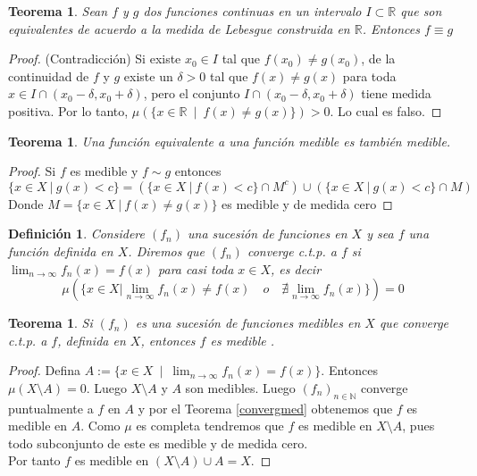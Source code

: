 \documentclass[twoside,12pt,a4 paper,openright]{book}
\newtheorem{teo}[claim]{Teorema}
\newtheorem{defi}[claim]{Definici\'on}
\begin{document}
\begin{teo}
    Sean $f$ y $g$ dos funciones continuas en un intervalo $I\subset\mathbb{R}$  que son equivalentes de acuerdo a la medida de Lebesgue construida en $\mathbb{R}$. Entonces $f\equiv g$ 
\end{teo}
\begin{proof}
    (Contradicci\'on) Si existe $x_0\in I$ tal que $f(x_0)\neq g(x_0)$, de la continuidad de $f$ y $g$ existe un $\delta >0$ tal que $f(x)\neq g(x)$ para toda $x \in I\cap(x_0-\delta, x_0+\delta)$, pero el conjunto $I\cap(x_0-\delta, x_0+\delta)$ tiene medida positiva.  Por lo tanto, $\mu(\{x\in\mathbb R \ \mid \ f(x)\neq g(x)\}) >0$. Lo cual es falso. 
\end{proof}




\begin{teo}
    Una funci\'on equivalente a una funci\'on medible es tambi\'en medible. 
    \end{teo}
    \begin{proof}
    Si $f$ es medible y $f\sim g$ entonces
    $$\{x \in  X \ | \ g(x)<c\} = (\{x \in  X \ | \  f(x)< c\}\cap M^c)\cup (\{x \in  X \ | \  g(x)<c \}\cap M)$$
    Donde $M = \{x \in  X \ | \  f(x)\neq g(x)\}$ es medible y de medida cero
\end{proof}
\begin{defi}
    Considere $(f_n)$ una sucesi\'on de funciones en $X$ y sea $f$ una funci\'on definida en $X$. Diremos que $(f_n)$ converge c.t.p. a $f$ si 
 $\lim_{n\to\infty}f_n(x) = f(x)$ 
    para casi toda $x\in X$, es decir 
    $$\mu\left(\{x\in X | \lim_{n\to \infty}f_n(x)\neq f(x) \quad o\quad \nexists\lim_{n\to \infty}f_n(x)\}\right) = 0$$
\end{defi}






\begin{teo}
    Si $(f_n)$ es una sucesi\'on de funciones medibles en $X$ que  converge c.t.p. a $f$, definida en $X$, entonces $f$ es medible .
\end{teo}

\begin{proof}

Defina    $ A := \{x\in X \  \mid  \ \lim_{n\to \infty}f_n(x) = f(x)\} $. Entonces  $\mu(X\setminus A)= 0$. Luego $X\setminus A$ y $A$ son  medibles. Luego $(f_n)_{n\in \mathbb N} $ converge puntualmente a $f$ en $A$ y por el Teorema \ref{convergmed}   
obtenemos que  $f$ es medible en $A$. 
  Como $\mu $ es completa tendremos que
    $f$ es medible en $X\setminus A$, pues todo subconjunto de este es medible y de medida cero. 
    \\
    Por tanto $f$ es medible en $(X\setminus A)\cup A = X$.
\end{proof}
    
\end{document}
